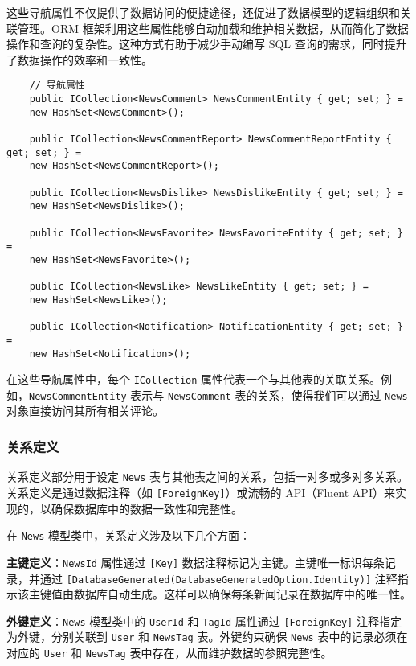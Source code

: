 这些导航属性不仅提供了数据访问的便捷途径，还促进了数据模型的逻辑组织和关联管理。ORM 框架利用这些属性能够自动加载和维护相关数据，从而简化了数据操作和查询的复杂性。这种方式有助于减少手动编写 SQL 查询的需求，同时提升了数据操作的效率和一致性。

\begin{verbatim}
	// 导航属性
	public ICollection<NewsComment> NewsCommentEntity { get; set; } =
	new HashSet<NewsComment>();
	
	public ICollection<NewsCommentReport> NewsCommentReportEntity { get; set; } =
	new HashSet<NewsCommentReport>();
	
	public ICollection<NewsDislike> NewsDislikeEntity { get; set; } =
	new HashSet<NewsDislike>();
	
	public ICollection<NewsFavorite> NewsFavoriteEntity { get; set; } =
	new HashSet<NewsFavorite>();
	
	public ICollection<NewsLike> NewsLikeEntity { get; set; } =
	new HashSet<NewsLike>();
	
	public ICollection<Notification> NotificationEntity { get; set; } =
	new HashSet<Notification>();
\end{verbatim}

在这些导航属性中，每个 \texttt{ICollection} 属性代表一个与其他表的关联关系。例如，\texttt{NewsCommentEntity} 表示与 \texttt{NewsComment} 表的关系，使得我们可以通过 \texttt{News} 对象直接访问其所有相关评论。

\subsubsection{关系定义}

关系定义部分用于设定 \texttt{News} 表与其他表之间的关系，包括一对多或多对多关系。关系定义是通过数据注释（如 \texttt{[ForeignKey]}）或流畅的 API（Fluent API）来实现的，以确保数据库中的数据一致性和完整性。

在 \texttt{News} 模型类中，关系定义涉及以下几个方面：


\textbf{主键定义}：\texttt{NewsId} 属性通过 \texttt{[Key]} 数据注释标记为主键。主键唯一标识每条记录，并通过 \texttt{[DatabaseGenerated(DatabaseGeneratedOption.Identity)]} 注释指示该主键值由数据库自动生成。这样可以确保每条新闻记录在数据库中的唯一性。

\textbf{外键定义}：\texttt{News} 模型类中的 \texttt{UserId} 和 \texttt{TagId} 属性通过 \texttt{[ForeignKey]} 注释指定为外键，分别关联到 \texttt{User} 和 \texttt{NewsTag} 表。外键约束确保 \texttt{News} 表中的记录必须在对应的 \texttt{User} 和 \texttt{NewsTag} 表中存在，从而维护数据的参照完整性。

